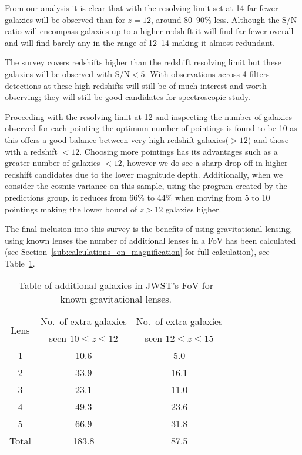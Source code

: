 	From our analysis it is clear that with the resolving limit set at 14 far fewer galaxies will be observed than for $z=12$, around 80--90\% less. Although the S/N ratio will encompass galaxies up to a higher redshift it will find far fewer overall and will find barely any in the range of 12--14 making it almost redundant.

	The survey covers redshifts higher than the redshift resolving limit but these galaxies will be observed with S/N$< 5$. With observations across 4 filters detections at these high redshifts will still be of much interest and worth observing; they will still be good candidates for spectroscopic study.

	Proceeding with the resolving limit at 12 and inspecting the number of galaxies observed for each pointing the optimum number of pointings is found to be 10 as this offers a good balance between very high redshift galaxies($>12$) and those with a redshift $<12$. Choosing more pointings has its advantages such as a greater number of galaxies $<12$, however we do see a sharp drop off in higher redshift candidates due to the lower magnitude depth. Additionally, when we consider the cosmic variance on this sample, using the program created by the predictions group, it reduces from 66\% to 44\% when moving from 5 to 10 pointings making the lower bound of $z>12$ galaxies higher.

	The final inclusion into this survey is the benefits of using gravitational lensing, using known lenses the number of additional lenses in a FoV has been calculated (see Section~\ref{sub:calculations_on_magnification} for full calculation), see Table~\ref{tab:FoV_for_known_gravitational_lenses}.
	\begin{table}[htbp]
		\begin{center}
			\begin{tabular}{c|c|c}
				\multirow{2}{*}{Lens} & No.\ of extra galaxies & No.\ of extra galaxies  \\
				 & seen $10\le z \le12$ & seen $12\le z \le15$ \\
				 \hline\hline
				1 	& 10.6 		& 5.0 \\
				2 	& 33.9 		& 16.1 \\
				3 	& 23.1 		& 11.0 \\
				4 	& 49.3 		& 23.6 \\
				5 	& 66.9 		& 31.8 \\
				\hline
				Total & 183.8 	& 87.5
			\end{tabular}
		\end{center}
		\caption{Table of additional galaxies in JWST's FoV for known gravitational lenses.\label{tab:FoV_for_known_gravitational_lenses}}
	\end{table}


